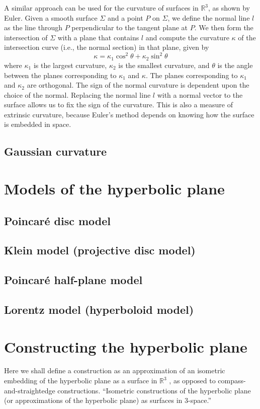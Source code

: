 \documentclass{article}
\begin{document}
A similar approach can be used for the curvature of surfaces in $\mathbb{R}^3$, as shown by Euler.
Given a smooth surface $\Sigma$ and a point $P$ on $\Sigma$, we define the normal line $l$ as the line through $P$ perpendicular to the tangent plane at $P$.
We then form the intersection of $\Sigma$ with a plane that contains $l$ and compute the curvature $\kappa$ of the intersection curve (i.e., the normal section) in that plane, given by
\[ \kappa = \kappa_1 \cos^2 \theta + \kappa_2 \sin^2 \theta \]
where $\kappa_1$ is the largest curvature, $\kappa_2$ is the smallest curvature, and $\theta$ is the angle between the planes corresponding to $\kappa_1$ and $\kappa$.
The planes corresponding to $\kappa_1$ and $\kappa_2$ are orthogonal.
The sign of the normal curvature is dependent upon the choice of the normal.
Replacing the normal line $l$ with a normal vector to the surface allows us to fix the sign of the curvature.\cite{singer}
This is also a measure of extrinsic curvature, because Euler's method depends on knowing how the surface is embedded in space.\cite{adventures}
\subsection{Gaussian curvature}

\section{Models of the hyperbolic plane}
\subsection{Poincar\'e disc model}
\subsection{Klein model (projective disc model)}
\subsection{Poincar\'e half-plane model}
\subsection{Lorentz model (hyperboloid model)}

\section{Constructing the hyperbolic plane}
Here we shall define a construction as an approximation of an isometric embedding of the hyperbolic plane as a surface in $\mathbb{R}^3$ \cite{crochetplane}, as opposed to compass-and-straightedge constructions.
``Isometric constructions of the hyperbolic plane (or approximations of the hyperbolic plane) as surfaces in 3-space.'' \cite{crochetplane}
\end{document}
